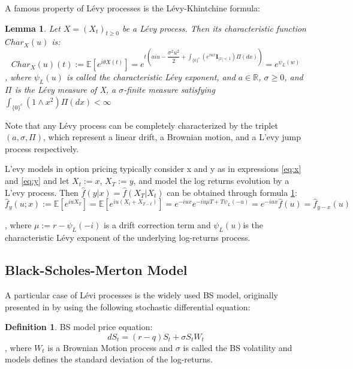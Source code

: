 \documentclass[12,twoside]{mammeTFM}
\newtheorem{lem}[thm]{Lemma}
\theoremstyle{definition}
\newtheorem{definition}[thm]{Definition}
\theoremstyle{remark}
\newcommand{\E}{\ensuremath{\mathbb{E}}}
\newcommand{\R}{\ensuremath{\mathbb{R}}}
\begin{document}
A famous property of L\'evy processes is the L\'evy-Khintchine formula:
\begin{lem}\label{levy_khin} Let $X = (X_t)_{t\geq 0}$ be a L\'evy process. Then its characteristic function $Char_X(u)$ is:
$$
Char_X(u)(t) := \E \left[e^{i\theta X(t)}\right] = e^{t\left(aiu - \dfrac{\sigma^2 u^2}{2} + \int_{\{0\}^c}(e^{iu x} \textbf{I}_{|x| < 1})\Pi(dx)\right)} = e^{\psi_L(w)}
$$
, where $\psi_L(u)$ is called the characteristic L\'evy exponent, and $a \in \R$, $\sigma \geq 0$, and $\Pi$ is the L\'evy measure of X, a $\sigma$-finite measure satisfying $\int_{\{0\} ^c}(1 \wedge x^2)\Pi (dx) < \infty$
\end{lem}

Note that any L\'evy process can be completely characterized by the triplet $(a, \sigma, \Pi)$, which represent a linear drift, a Brownian motion, and a L'evy jump process respectively.

L'evy models in option pricing typically consider x and y as in expressions \ref{eq:x} and \ref{eq:y} and let $X_t := x$, $X_T := y$, and model the log returns evolution by a L'evy process. Then $\hat{f}(y|x) = \hat{f}(X_T|X_t)$ can be obtained through formula \ref{levy_khin}:
\begin{equation}
\hat{f}_{y}(u; x) := 
\E\left[e^{iu X_T}\right] = 
\E\left[e^{iu (X_t + X_{T-t})}\right] = 
e^{-iu x}e^{-i u \mu T + T \psi_L(-u)} = 
e^{-iu x}\hat{f}(u) = 
\hat{f}_{y - x}(u)
\end{equation}

, where $\mu:= r - \psi_L(-i)$ is a drift correction term and $\psi_L(u)$is the characteristic L\'evy exponent of the underlying log-returns process.

\subsection{Black-Scholes-Merton Model} \label{subsec:bs}

A particular case of L\'evi processes is the widely used BS model, originally presented in \cite{bs73} by using the following stochastic differential equation:
\begin{definition} BS model price equation:
\begin{equation}
dS_t = (r - q) S_t + \sigma S_t W_t
\end{equation}
, where $W_t$ is a Brownian Motion process and $\sigma$ is called the BS volatility and models defines the standard deviation of the log-returns.
\end{definition}
\end{document}
